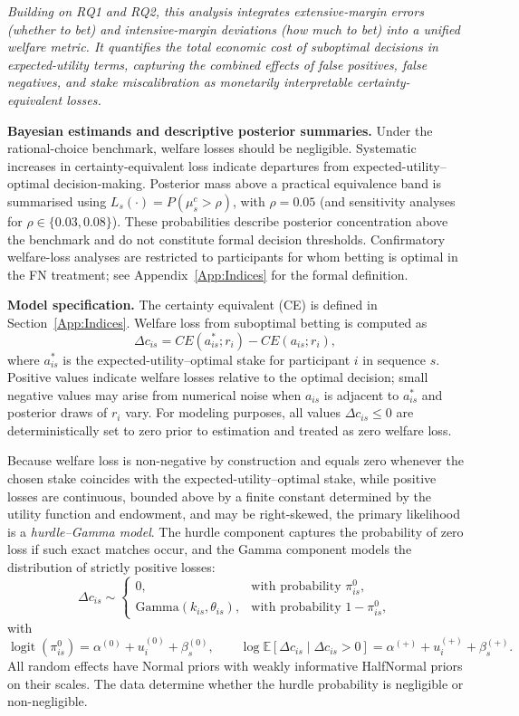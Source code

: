 \documentclass[11pt,a4paper]{article}
\numberwithin{equation}{section}
\begin{document}
\textit{Building on RQ1 and RQ2, this analysis integrates extensive-margin errors
	(whether to bet) and intensive-margin deviations (how much to bet) into a unified
	welfare metric. It quantifies the total economic cost of suboptimal decisions in
	expected-utility terms, capturing the combined effects of false positives, false
	negatives, and stake miscalibration as monetarily interpretable
	certainty-equivalent losses.}

\textbf{Bayesian estimands and descriptive posterior summaries.}
Under the rational-choice benchmark, welfare losses should be negligible. 
Systematic increases in certainty-equivalent loss indicate departures from 
expected-utility–optimal decision-making. Posterior mass above a practical 
equivalence band is summarised using 
$L_s(\cdot) = P(\mu_s^{c} > \rho)$, 
with $\rho = 0.05$ (and sensitivity analyses for $\rho \in \{0.03,0.08\}$).  
These probabilities describe posterior concentration above the benchmark and do 
not constitute formal decision thresholds.
Confirmatory welfare-loss analyses are restricted to participants for whom
betting is optimal in the FN treatment; see Appendix~\ref{App:Indices} for the
formal definition.

\textbf{Model specification.}
The certainty equivalent (CE) is defined in Section~\ref{App:Indices}.  
Welfare loss from suboptimal betting is computed as
\[
\Delta c_{is} = CE(a^{*}_{is}; r_i) - CE(a_{is}; r_i),
\]
where $a^{*}_{is}$ is the expected-utility--optimal stake for participant $i$ in 
sequence $s$. 
Positive values indicate welfare losses relative to the optimal decision; small
negative values may arise from numerical noise when $a_{is}$ is adjacent to
$a^{*}_{is}$ and posterior draws of $r_i$ vary. 
For modeling purposes, all values
$\Delta c_{is} \le 0$ are deterministically set to zero prior to estimation and
treated as zero welfare loss.

Because welfare loss is non-negative by construction and equals zero whenever the 
chosen stake coincides with the expected-utility--optimal stake, while positive 
losses are continuous, bounded above by a finite constant determined by the utility 
function and endowment, and may be right-skewed, the primary likelihood is a 
\emph{hurdle--Gamma model}.  
The hurdle component captures the probability of zero loss if such exact matches 
occur, and the Gamma component models the distribution of strictly positive losses:
\[
\Delta c_{is} \sim 
\begin{cases}
	0, & \text{with probability } \pi_{is}^{0}, \\[4pt]
	\mathrm{Gamma}(k_{is},\theta_{is}), & \text{with probability } 1-\pi_{is}^{0},
\end{cases}
\]
with
\[
\operatorname{logit}(\pi_{is}^{0}) = \alpha^{(0)} + u_i^{(0)} + \beta_s^{(0)},
\qquad
\log \mathbb{E}[\Delta c_{is}\mid \Delta c_{is}>0] 
= \alpha^{(+)} + u_i^{(+)} + \beta_s^{(+)}.
\]
All random effects have Normal priors with weakly informative HalfNormal priors on 
their scales. The data determine whether the hurdle probability is negligible or 
non-negligible.
\end{document}
